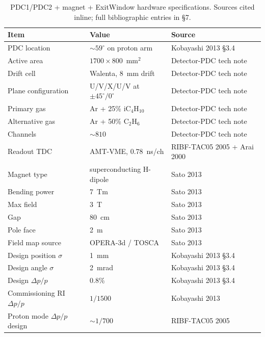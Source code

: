 \documentclass[a4paper, 11pt]{article}
\begin{document}
\begin{table}[H]
  \centering
  \small
  \begin{tabular}{p{5.0cm} p{5.0cm} p{4.6cm}}
    \toprule
    Item & Value & Source \\
    \midrule
    PDC location              & $\sim 59^\circ$ on proton arm        & Kobayashi 2013 §3.4 \\
    Active area               & $1700 \times 800$~mm$^2$             & Detector-PDC tech note \\
    Drift cell                & Walenta, 8~mm drift                  & Detector-PDC tech note \\
    Plane configuration       & U/V/X/U/V at $\pm 45^\circ/0^\circ$  & Detector-PDC tech note \\
    Primary gas               & Ar + 25\% iC$_4$H$_{10}$             & Detector-PDC tech note \\
    Alternative gas           & Ar + 50\% C$_2$H$_6$                 & Detector-PDC tech note \\
    Channels                  & $\sim 810$                           & Detector-PDC tech note \\
    Readout TDC               & AMT-VME, 0.78~ns/ch                  & RIBF-TAC05 2005 + Arai 2000 \\
    Magnet type               & superconducting H-dipole             & Sato 2013 \\
    Bending power             & 7~Tm                                 & Sato 2013 \\
    Max field                 & 3~T                                  & Sato 2013 \\
    Gap                       & 80~cm                                & Sato 2013 \\
    Pole face                 & 2~m                                  & Sato 2013 \\
    Field map source          & OPERA-3d / TOSCA                     & Sato 2013 \\
    Design position $\sigma$  & 1~mm                                 & Kobayashi 2013 §3.4 \\
    Design angle $\sigma$     & 2~mrad                               & Kobayashi 2013 §3.4 \\
    Design $\Delta p/p$       & 0.8\%                                & Kobayashi 2013 §3.4 \\
    Commissioning RI $\Delta p/p$ & $1/1500$                         & Kobayashi 2013 \\
    Proton mode $\Delta p/p$ design & $\sim 1/700$                   & RIBF-TAC05 2005 \\
    \bottomrule
  \end{tabular}
  \caption{PDC1/PDC2 + magnet + ExitWindow hardware specifications. Sources cited inline; full bibliographic entries in §7.}
  \label{tab:hardware-spec}
\end{table}
\end{document}
